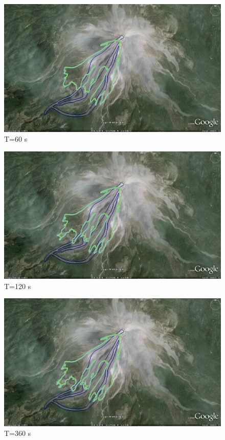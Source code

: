 \documentclass[letterpaper,10pt]{article}
\begin{document}
\begin{figure}[H]
\centerline{\includegraphics[width=.9\textwidth]{IMAGES/pics/tiny6.jpg}}
\caption{T=60 s}
\label{yextent}
\end{figure}
\begin{figure}[H]
\centerline{\includegraphics[width=.9\textwidth]{IMAGES/pics/tiny12.jpg}}
\caption{T=120 s}
\label{geoflow_interface}
\end{figure}
\begin{figure}[H]
\centerline{\includegraphics[width=.9\textwidth]{IMAGES/pics/tiny36.jpg}}
\caption{T=360 s}
\label{geoflow_interface}
\end{figure}
\end{document}
